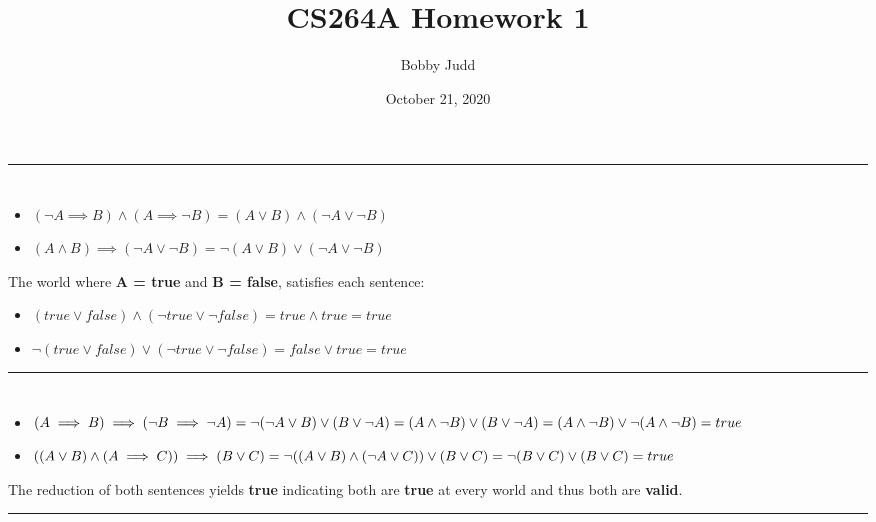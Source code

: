 \documentclass{article}
\title{CS264A Homework 1}
\author{Bobby Judd}
\date{October 21, 2020}
\begin{document}
\maketitle

\noindent\rule{16cm}{0.4pt}
\section{}
\begin{itemize}
\item $(\lnot A \implies B) \land (A \implies \lnot B) = (A \lor B) \land (\lnot A \lor \lnot B)$
\item $(A \land B) \implies (\lnot A \lor \lnot B) = \lnot(A \lor B) \lor (\lnot A \lor \lnot B)$
\end{itemize}
The world where \textbf{A = true} and \textbf{B = false}, satisfies each sentence:
\begin{itemize}
\item $(true \lor false) \land (\lnot true \lor \lnot false) = true \land true = true$
\item $\lnot(true \lor false) \lor (\lnot true \lor \lnot false) = false \lor true = true$
\end{itemize}

\noindent\rule{16cm}{0.4pt}
\section{}
\begin{itemize}
\item $(A \implies B) \implies (\lnot B \implies \lnot A)\\
       = \lnot(\lnot A \lor B) \lor (B \lor \lnot A)\\
       = (A \land \lnot B) \lor (B \lor \lnot A)\\
       = (A \land \lnot B) \lor \lnot (A \land \lnot B)\\
       = true$
\item $((A \lor B) \land (A \implies C)) \implies (B \lor C)\\
        = \lnot ((A \lor B) \land (\lnot A \lor C)) \lor (B \lor C)\\
        = \lnot(B \lor C) \lor (B \lor C)\\
        = true$
\end{itemize}
The reduction of both sentences yields \textbf{true} indicating both are \textbf{true} at every world and thus both are \textbf{valid}.

\noindent\rule{16cm}{0.4pt}
\end{document}
